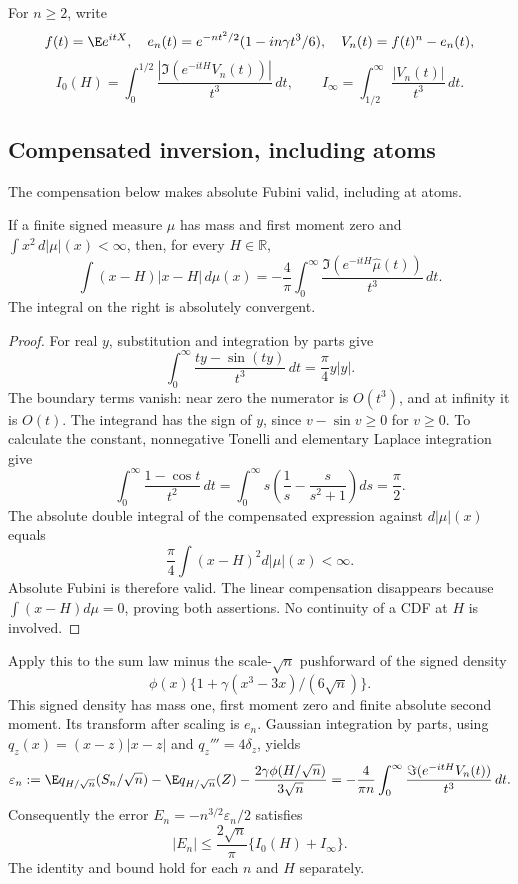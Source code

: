 For $n\ge2$, write
\[
 f(t)=\E e^{itX},\quad e_n(t)=e^{-nt^2/2}(1-in\gamma t^3/6),\quad
 V_n(t)=f(t)^n-e_n(t),
\]
\[
 I_0(H)=\int_0^{1/2}\frac{|\Im(e^{-itH}V_n(t))|}{t^3}\,dt,\qquad
 I_\infty=\int_{1/2}^\infty\frac{|V_n(t)|}{t^3}\,dt.
\]
\subsection{Compensated inversion, including atoms}

The compensation below makes absolute Fubini valid, including at atoms.

\begin{lemma}\label{j:fourier:inversion}
If a finite signed measure $\mu$ has mass and first moment zero and
$\int x^2\,d|\mu|(x)<\infty$, then, for every $H\in\mathbb R$,
\[
 \int(x-H)|x-H|\,d\mu(x)
 =-\frac4\pi\int_0^\infty
 \frac{\Im(e^{-itH}\widehat\mu(t))}{t^3}\,dt.
\]
The integral on the right is absolutely convergent.
\end{lemma}
\begin{proof}
For real $y$, substitution and integration by parts give
\[
 \int_0^\infty\frac{ty-\sin(ty)}{t^3}\,dt=\frac\pi4 y|y|.
\]
The boundary terms vanish: near zero the numerator is $O(t^3)$, and
at infinity it is $O(t)$. The integrand has the sign of $y$, since
$v-\sin v\ge0$ for $v\ge0$. To calculate the constant, nonnegative
Tonelli and elementary Laplace integration give
\[
 \int_0^\infty\frac{1-\cos t}{t^2}\,dt
 =\int_0^\infty s\left(\frac1s-\frac{s}{s^2+1}\right)ds
 =\frac\pi2.
\]
The absolute double integral of the compensated expression against
$d|\mu|(x)$ equals
\[
 \frac\pi4\int(x-H)^2d|\mu|(x)<\infty.
\]
Absolute Fubini is therefore valid. The linear compensation disappears
because $\int(x-H)d\mu=0$, proving both assertions. No continuity of a
CDF at $H$ is involved.
\end{proof}

Apply this to the sum law minus the scale-$\sqrt n$ pushforward of
the signed density
\[
 \phi(x)\{1+\gamma(x^3-3x)/(6\sqrt n)\}.
\]
This signed density has mass one, first moment zero and finite absolute
second moment. Its transform after scaling is $e_n$. Gaussian integration
by parts, using $q_z(x)=(x-z)|x-z|$ and $q_z'''=4\delta_z$, yields
\[
 \varepsilon_n:=\E q_{H/\sqrt n}(S_n/\sqrt n)
 -\E q_{H/\sqrt n}(Z)-\frac{2\gamma\phi(H/\sqrt n)}{3\sqrt n}
 =-\frac4{\pi n}\int_0^\infty
 \frac{\Im(e^{-itH}V_n(t))}{t^3}\,dt.
\]
Consequently the error $E_n=-n^{3/2}\varepsilon_n/2$ satisfies
\begin{equation}\label{j:fourier:ledger}
 |E_n|\le\frac{2\sqrt n}{\pi}\{I_0(H)+I_\infty\}.
\end{equation}
The identity and bound hold for each $n$ and $H$ separately.

